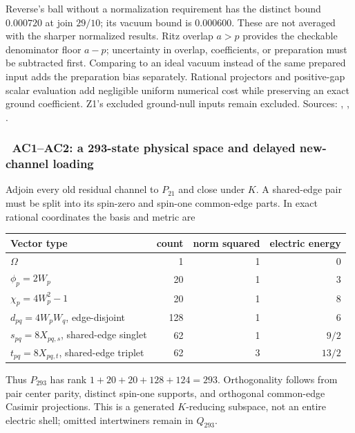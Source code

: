 Reverse's ball without a normalization requirement has the distinct bound
$0.000720$ at join $29/10$; its vacuum bound is $0.000600$.  These are not
averaged with the sharper normalized results.  Ritz overlap $a>p$ provides the
checkable denominator floor $a-p$; uncertainty in overlap, coefficients, or
preparation must be subtracted first.  Comparing to an ideal vacuum instead
of the same prepared input adds the preparation bias separately.  Rational
projectors and positive-gap scalar evaluation add negligible uniform numerical
cost while preserving an exact ground coefficient.  Z1's excluded ground-null
inputs remain excluded.
Sources: ,
,
.

\subsubsection{\workstar\ AC1--AC2: a 293-state physical space and delayed new-channel loading}

Adjoin every old residual channel to $P_{21}$ and close under $K$.  A shared-edge
pair must be split into its spin-zero and spin-one common-edge parts.  In exact
rational coordinates the basis and metric are
\begin{center}
\begin{tabular}{lrrr}
Vector type & count & norm squared & electric energy\\\hline
$\Omega$ &1&1&0\\
$\phi_p=2W_p$&20&1&3\\
$\chi_p=4W_p^2-1$&20&1&8\\
$d_{pq}=4W_pW_q$, edge-disjoint&128&1&6\\
$s_{pq}=8X_{pq,s}$, shared-edge singlet&62&1&$9/2$\\
$t_{pq}=8X_{pq,t}$, shared-edge triplet&62&3&$13/2$
\end{tabular}
\end{center}
Thus $P_{293}$ has rank $1+20+20+128+124=293$.  Orthogonality follows from
pair center parity, distinct spin-one supports, and orthogonal common-edge
Casimir projections.  This is a generated $K$-reducing subspace, not an entire
electric shell; omitted intertwiners remain in $Q_{293}$.


